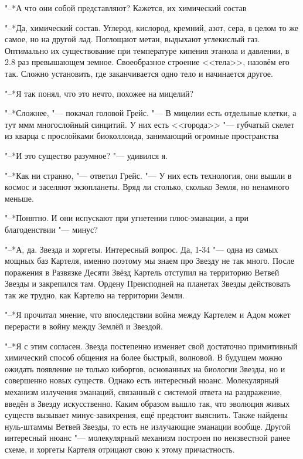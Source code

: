 \documentclass[a4paper,10pt,fleqn]{book}
\newcommand{\ldotst}{\so{...}\xspace}
\begin{document}
"--*А что они собой представляют?
Кажется, их химический состав\ldotst

"--*Да, химический состав.
Углерод, кислород, кремний, азот, сера, в целом то же самое, но на другой лад.
Поглощают метан, выдыхают углекислый газ.
Оптимально их существование при температуре кипения этанола и давлении, в 2.8 раз превышающем земное.
Своеобразное строение <<тела>>, назовём его так.
Сложно установить, где заканчивается одно тело и начинается другое.

"--*Я так понял, что это нечто, похожее на мицелий?

"--*Сложнее, "--- покачал головой Грейс.
"--- В мицелии есть отдельные клетки, а тут\ldotst ммм\ldotst многослойный синцитий.
У них есть <<города>> "--- губчатый скелет из кварца с прослойками биоколлоида, занимающий огромные пространства\ldotst

"--*И это существо разумное? "--- удивился я.

"--*Как ни странно, "--- ответил Грейс.
"--- У них есть технология, они вышли в космос и заселяют экзопланеты.
Вряд ли столько, сколько Земля, но ненамного меньше.

"--*Понятно.
И они испускают при угнетении плюс-эманации, а при благоденствии "--- минус?

"--*А, да.
Звезда и хоргеты.
Интересный вопрос.
Да, 1-34 "--- одна из самых мощных баз Картеля, именно поэтому мы знаем про Звезду не так много.
После поражения в Развязке Десяти Звёзд Картель отступил на территорию Ветвей Звезды и закрепился там.
Ордену Преисподней на планетах Звезды действовать так же трудно, как Картелю на территории Земли.

"--*Я прочитал мнение, что впоследствии война между Картелем и Адом может перерасти в войну между Землёй и Звездой.

"--*Я с этим согласен.
Звезда постепенно изменяет свой достаточно примитивный химический способ общения на более быстрый, волновой.
В будущем можно ожидать появление не только киборгов, основанных на биологии Звезды, но и совершенно новых существ.
Однако есть интересный нюанс.
Молекулярный механизм излучения эманаций, связанный с системой ответа на раздражение, введён в Звезду искусственно.
Каким образом вышло так, что эволюция живых существ вызывает минус-завихрения, ещё предстоит выяснить.
Также найдены нуль-штаммы Ветвей Звезды, то есть не излучающие эманации вообще.
Другой интересный нюанс "--- молекулярный механизм построен по неизвестной ранее схеме, и хоргеты Картеля отрицают свою к этому причастность.
\end{document}
